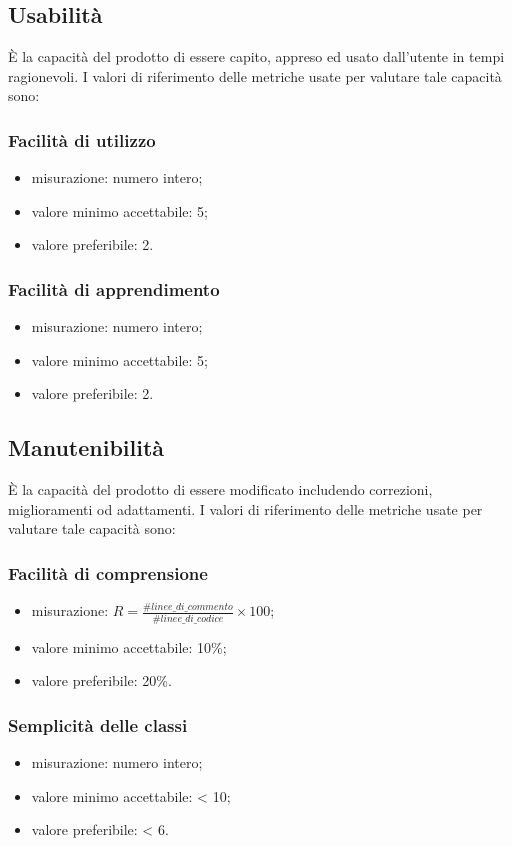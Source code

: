 \subsection{Usabilità}
È la capacità del prodotto di essere capito, appreso ed usato dall'utente in tempi ragionevoli.
I valori di riferimento delle metriche usate per valutare tale capacità sono:

	\subsubsection*{Facilità di utilizzo}
	\begin{itemize}
		\item {misurazione: numero intero;}
		\item {valore minimo accettabile: 5;}
		\item {valore preferibile: 2.}
		\end{itemize}
		
	\subsubsection*{Facilità di apprendimento}
	\begin{itemize}
		\item {misurazione: numero intero;}
		\item {valore minimo accettabile: 5;}
		\item {valore preferibile: 2.}
	\end{itemize}
	
\subsection{Manutenibilità}
È la capacità del prodotto di essere modificato includendo correzioni, miglioramenti od adattamenti. 
I valori di riferimento delle metriche usate per valutare tale capacità sono:

	\subsubsection*{Facilità di comprensione}
	\begin{itemize}
		\item{misurazione: $R = \displaystyle\frac{\#linee\_di\_commento}{\#linee\_di\_codice}\times100$;}
		\item {valore minimo accettabile: 10\%;}
		\item {valore preferibile: 20\%.}
	\end{itemize}
	
	\subsubsection*{Semplicità delle classi}
		\begin{itemize}
			\item {misurazione: numero intero;}
			\item {valore minimo accettabile: < 10;}
			\item {valore preferibile: < 6.}
	\end{itemize}